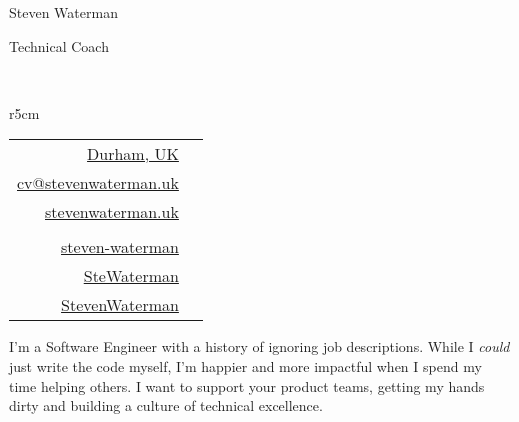 \documentclass[hidelinks, 12pt, a4paper]{article}
\begin{document}
	
	\begin{Huge}Steven Waterman\end{Huge}
	
	\vspace{6pt}\hspace{120pt} \begin{large}Technical Coach\end{large}\\
	
	\begin{wraptable}{r}{5cm}
		\vspace{-75pt}
		\begin{tabular}{rc}
			\href{https://en.wikipedia.org/wiki/Durham,_England}{Durham, UK} & \href{https://en.wikipedia.org/wiki/Durham,_England}{\faHome} \\
			\href{mailto:cv@stevenwaterman.uk}{cv@stevenwaterman.uk} & \href{mailto:cv@stevenwaterman.uk}{\faEnvelope} \\
			\href{http://www.stevenwaterman.uk}{stevenwaterman.uk} & \href{http://www.stevenwaterman.uk}{\faLink} \\
			&\\
			\href{https://www.linkedin.com/in/steven-waterman/}{steven-waterman} & \href{https://www.linkedin.com/in/steven-waterman/}{\faLinkedin} \\
			\href{https://twitter.com/SteWaterman}{SteWaterman} & \href{https://twitter.com/SteWaterman}{\faTwitter} \\
			\href{https://github.com/stevenwaterman}{StevenWaterman} & \href{https://github.com/stevenwaterman}{\faGithub}
		\end{tabular}
	\end{wraptable}
	
	I'm a Software Engineer with a history of ignoring job descriptions.
	While I \emph{could} just write the code myself, I'm happier and more impactful when I spend my time helping others.
	I want to support your product teams, getting my hands dirty and building a culture of technical excellence.
	
	

	
%		
	
\end{document}
